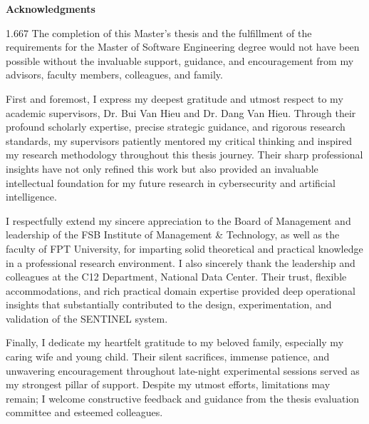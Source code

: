 \documentclass[12pt,a4paper]{report}
\renewcommand{\listfigurename}{List of Figure}
\begin{document}
\newpage
{}
\begin{center}
    {\Large\textbf{Acknowledgments}}
\end{center}
\vspace{0.5cm}

\begin{spacing}{1.667}
The completion of this Master's thesis and the fulfillment of the requirements for the Master of Software Engineering degree would not have been possible without the invaluable support, guidance, and encouragement from my advisors, faculty members, colleagues, and family.

First and foremost, I express my deepest gratitude and utmost respect to my academic supervisors, Dr. Bui Van Hieu and Dr. Dang Van Hieu. Through their profound scholarly expertise, precise strategic guidance, and rigorous research standards, my supervisors patiently mentored my critical thinking and inspired my research methodology throughout this thesis journey. Their sharp professional insights have not only refined this work but also provided an invaluable intellectual foundation for my future research in cybersecurity and artificial intelligence.

I respectfully extend my sincere appreciation to the Board of Management and leadership of the FSB Institute of Management \& Technology, as well as the faculty of FPT University, for imparting solid theoretical and practical knowledge in a professional research environment. I also sincerely thank the leadership and colleagues at the C12 Department, National Data Center. Their trust, flexible accommodations, and rich practical domain expertise provided deep operational insights that substantially contributed to the design, experimentation, and validation of the SENTINEL system.

Finally, I dedicate my heartfelt gratitude to my beloved family, especially my caring wife and young child. Their silent sacrifices, immense patience, and unwavering encouragement throughout late-night experimental sessions served as my strongest pillar of support. Despite my utmost efforts, limitations may remain; I welcome constructive feedback and guidance from the thesis evaluation committee and esteemed colleagues.
\end{spacing}


\newpage
\tableofcontents

\newpage
\cleardoublepage
\addcontentsline{toc}{chapter}{\listfigurename}
\listoffigures
\end{document}
